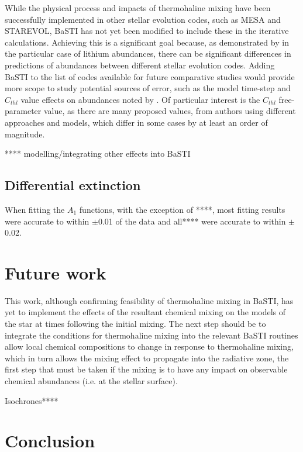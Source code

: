 \documentclass[usenatbib]{mnras}
\begin{document}
While the physical process and impacts of thermohaline mixing have been successfully implemented in other stellar evolution codes, such as MESA and STAREVOL, BaSTI has not yet been modified to include these in the iterative calculations. Achieving this is a significant goal because, as demonstrated by \citet{2015MNRAS.446.2673L} in the particular case of lithium abundances, there can be significant differences in predictions of abundances between different stellar evolution codes. Adding BaSTI to the list of codes available for future comparative studies would provide more scope to study potential sources of error, such as the model time-step and $C_{thl}$ value effects on abundances noted by \citet{2015MNRAS.446.2673L}. Of particular interest is the $C_{thl}$ free-parameter value, as there are many proposed values, from authors using different approaches and models, which differ in some cases by at least an order of magnitude.

**** modelling/integrating other effects into BaSTI



\subsection{Differential extinction}
When fitting the $A_{1}$ functions, with the exception of ****, most fitting results were accurate to within $\pm$0.01 of the data and all**** were accurate to within $\pm$0.02.

\section{Future work}

This work, although confirming feasibility of thermohaline mixing in BaSTI, has yet to implement the effects of the resultant chemical mixing on the models of the star at times following the initial mixing. The next step should be to integrate the conditions for thermohaline mixing into the relevant BaSTI routines allow local chemical compositions to change in response to thermohaline mixing, which in turn allows the mixing effect to propagate into the radiative zone, the first step that must be taken if the mixing is to have any impact on observable chemical abundances (i.e. at the stellar surface).

Isochrones****

\section{Conclusion}



\end{document}
